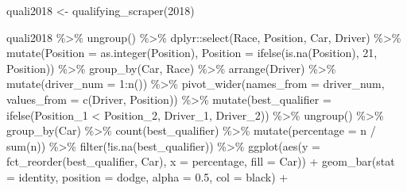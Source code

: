 \documentclass[
]{book}
\newenvironment{Shaded}{\begin{snugshade}}{\end{snugshade}}
\newcommand{\AttributeTok}[1]{\textcolor[rgb]{0.77,0.63,0.00}{#1}}
\newcommand{\DecValTok}[1]{\textcolor[rgb]{0.00,0.00,0.81}{#1}}
\newcommand{\FloatTok}[1]{\textcolor[rgb]{0.00,0.00,0.81}{#1}}
\newcommand{\FunctionTok}[1]{\textcolor[rgb]{0.00,0.00,0.00}{#1}}
\newcommand{\NormalTok}[1]{#1}
\newcommand{\OtherTok}[1]{\textcolor[rgb]{0.56,0.35,0.01}{#1}}
\newcommand{\SpecialCharTok}[1]{\textcolor[rgb]{0.00,0.00,0.00}{#1}}
\newcommand{\StringTok}[1]{\textcolor[rgb]{0.31,0.60,0.02}{#1}}
\begin{document}
\begin{Shaded}
\begin{Highlighting}[]
\NormalTok{quali2018 }\OtherTok{\textless{}{-}} \FunctionTok{qualifying\_scraper}\NormalTok{(}\DecValTok{2018}\NormalTok{)}

\NormalTok{quali2018 }\SpecialCharTok{\%\textgreater{}\%}
  \FunctionTok{ungroup}\NormalTok{() }\SpecialCharTok{\%\textgreater{}\%}
\NormalTok{  dplyr}\SpecialCharTok{::}\FunctionTok{select}\NormalTok{(Race, Position, Car, Driver) }\SpecialCharTok{\%\textgreater{}\%}
  \FunctionTok{mutate}\NormalTok{(}\AttributeTok{Position =} \FunctionTok{as.integer}\NormalTok{(Position),}
         \AttributeTok{Position =} \FunctionTok{ifelse}\NormalTok{(}\FunctionTok{is.na}\NormalTok{(Position), }\DecValTok{21}\NormalTok{, Position)) }\SpecialCharTok{\%\textgreater{}\%} 
  \FunctionTok{group\_by}\NormalTok{(Car, Race) }\SpecialCharTok{\%\textgreater{}\%} 
  \FunctionTok{arrange}\NormalTok{(Driver) }\SpecialCharTok{\%\textgreater{}\%} 
  \FunctionTok{mutate}\NormalTok{(}\AttributeTok{driver\_num =} \DecValTok{1}\SpecialCharTok{:}\FunctionTok{n}\NormalTok{()) }\SpecialCharTok{\%\textgreater{}\%} 
  \FunctionTok{pivot\_wider}\NormalTok{(}\AttributeTok{names\_from =} \StringTok{\textquotesingle{}driver\_num\textquotesingle{}}\NormalTok{, }\AttributeTok{values\_from =} \FunctionTok{c}\NormalTok{(}\StringTok{\textquotesingle{}Driver\textquotesingle{}}\NormalTok{, }\StringTok{\textquotesingle{}Position\textquotesingle{}}\NormalTok{)) }\SpecialCharTok{\%\textgreater{}\%}
  \FunctionTok{mutate}\NormalTok{(}\AttributeTok{best\_qualifier =} \FunctionTok{ifelse}\NormalTok{(Position\_1 }\SpecialCharTok{\textless{}}\NormalTok{ Position\_2, Driver\_1, Driver\_2)) }\SpecialCharTok{\%\textgreater{}\%}
  \FunctionTok{ungroup}\NormalTok{() }\SpecialCharTok{\%\textgreater{}\%}
  \FunctionTok{group\_by}\NormalTok{(Car) }\SpecialCharTok{\%\textgreater{}\%}
  \FunctionTok{count}\NormalTok{(best\_qualifier) }\SpecialCharTok{\%\textgreater{}\%}
  \FunctionTok{mutate}\NormalTok{(}\AttributeTok{percentage =}\NormalTok{ n }\SpecialCharTok{/} \FunctionTok{sum}\NormalTok{(n)) }\SpecialCharTok{\%\textgreater{}\%}
  \FunctionTok{filter}\NormalTok{(}\SpecialCharTok{!}\FunctionTok{is.na}\NormalTok{(best\_qualifier)) }\SpecialCharTok{\%\textgreater{}\%}
  \FunctionTok{ggplot}\NormalTok{(}\FunctionTok{aes}\NormalTok{(}\AttributeTok{y =} \FunctionTok{fct\_reorder}\NormalTok{(best\_qualifier, Car), }\AttributeTok{x =}\NormalTok{ percentage, }\AttributeTok{fill =}\NormalTok{ Car)) }\SpecialCharTok{+}
  \FunctionTok{geom\_bar}\NormalTok{(}\AttributeTok{stat =} \StringTok{\textquotesingle{}identity\textquotesingle{}}\NormalTok{, }\AttributeTok{position =} \StringTok{\textquotesingle{}dodge\textquotesingle{}}\NormalTok{, }\AttributeTok{alpha =} \FloatTok{0.5}\NormalTok{, }\AttributeTok{col =} \StringTok{\textquotesingle{}black\textquotesingle{}}\NormalTok{) }\SpecialCharTok{+}

\end{Highlighting}
\end{Shaded}
\end{document}
